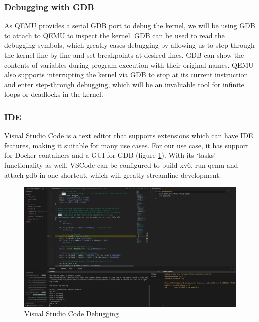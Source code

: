 \subsubsection{Debugging with GDB}
As QEMU provides a serial GDB port to debug the kernel, we will be using GDB to attach to QEMU
to inspect the kernel. GDB can be used to read the debugging symbols, which greatly eases debugging
by allowing us to step through the kernel line by line and set breakpoints at desired lines.
GDB can show the contents of variables during program execution with their original
names. QEMU also supports interrupting the kernel via GDB to stop at its current instruction
and enter step-through debugging, which will be an invaluable tool for infinite loops or deadlocks
in the kernel. 
\subsubsection{IDE}
Visual Studio Code \cite{vscode} is a text editor that supports extensions which can have IDE features,
making it suitable for many use cases. For our use case, it has support for Docker containers and
a GUI for GDB (figure \ref{figure:2}). With its `tasks' functionality as well, VSCode can
be configured to build xv6, run qemu and attach gdb in one shortcut, which will greatly
streamline development.

\begin{figure}[H]
    \centering
    \includegraphics[width=15cm]{Screenshot from 2022-04-26 13-05-47.png}
    \caption{Visual Studio Code Debugging}
    \label{figure:2}
\end{figure}

